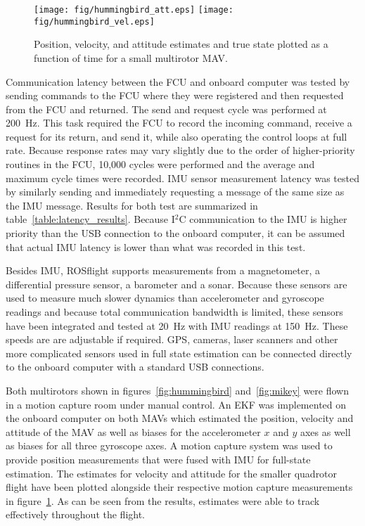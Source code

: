 \documentclass[letterpaper, 10 pt, conference]{ieeeconf}  %
\begin{document}
\begin{figure}
	\texttt{[image: fig/hummingbird\_att.eps]}
	\texttt{[image: fig/hummingbird\_vel.eps]}
	\caption{Position, velocity, and attitude estimates and true state plotted as a function of time for a small multirotor MAV.}
		\label{fig:hummingbird_results}
\end{figure}

Communication latency between the FCU and onboard computer was tested by sending commands to the FCU where they were registered and then requested from the FCU and returned. The send and request cycle was performed at 200~Hz.  This task required the FCU to record the incoming command, receive a request for its return, and send it, while also operating the control loops at full rate.  Because response rates may vary slightly due to the order of higher-priority routines in the FCU, 10,000 cycles were performed and the average and maximum cycle times were recorded. IMU sensor measurement latency was tested by similarly sending and immediately requesting a message of the same size as the IMU message.  Results for both test are summarized in table~\ref{table:latency_results}.  Because I$^2$C communication to the IMU is higher priority than the USB connection to the onboard computer, it can be assumed that actual IMU latency is lower than what was recorded in this test.

Besides IMU, ROSflight supports measurements from a magnetometer, a differential pressure sensor, a barometer and a sonar.  Because these sensors are used to measure much slower dynamics than accelerometer and gyroscope readings and because total communication bandwidth is limited, these sensors have been integrated and tested at 20~Hz with IMU readings at 150~Hz.  These speeds are are adjustable if required. GPS, cameras, laser scanners and other more complicated sensors used in full state estimation can be connected directly to the onboard computer with a standard USB connections.

Both multirotors shown in figures~\ref{fig:hummingbird} and~\ref{fig:mikey} were flown in a motion capture room under manual control.  An EKF was implemented on the onboard computer on both MAVs which estimated the position, velocity and attitude of the MAV as well as biases for the accelerometer $x$ and $y$ axes as well as biases for all three gyroscope axes.  A motion capture system was used to provide position measurements that were fused with IMU for full-state estimation. The estimates for velocity and attitude for the smaller quadrotor flight have been plotted alongside their respective motion capture measurements in figure~\ref{fig:hummingbird_results}. As can be seen from the results, estimates were able to track effectively throughout the flight.
\end{document}
